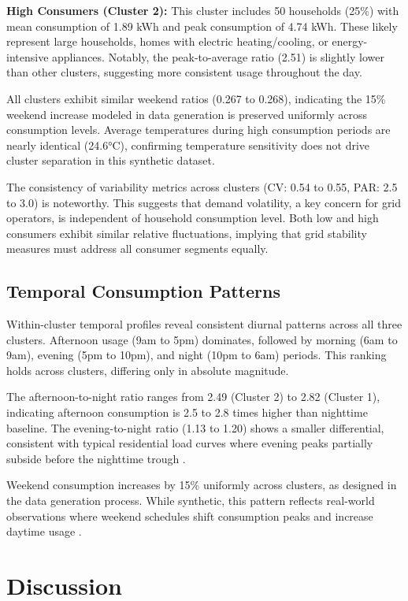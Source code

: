 \documentclass[11pt]{article}
\begin{document}
\textbf{High Consumers (Cluster 2):} This cluster includes 50 households (25\%) with mean consumption of 1.89 kWh and peak consumption of 4.74 kWh. These likely represent large households, homes with electric heating/cooling, or energy-intensive appliances. Notably, the peak-to-average ratio (2.51) is slightly lower than other clusters, suggesting more consistent usage throughout the day.

All clusters exhibit similar weekend ratios (0.267 to 0.268), indicating the 15\% weekend increase modeled in data generation is preserved uniformly across consumption levels. Average temperatures during high consumption periods are nearly identical (24.6°C), confirming temperature sensitivity does not drive cluster separation in this synthetic dataset.

The consistency of variability metrics across clusters (CV: 0.54 to 0.55, PAR: 2.5 to 3.0) is noteworthy. This suggests that demand volatility, a key concern for grid operators, is independent of household consumption level. Both low and high consumers exhibit similar relative fluctuations, implying that grid stability measures must address all consumer segments equally.

\subsection{Temporal Consumption Patterns}

Within-cluster temporal profiles reveal consistent diurnal patterns across all three clusters. Afternoon usage (9am to 5pm) dominates, followed by morning (6am to 9am), evening (5pm to 10pm), and night (10pm to 6am) periods. This ranking holds across clusters, differing only in absolute magnitude.

The afternoon-to-night ratio ranges from 2.49 (Cluster 2) to 2.82 (Cluster 1), indicating afternoon consumption is 2.5 to 2.8 times higher than nighttime baseline. The evening-to-night ratio (1.13 to 1.20) shows a smaller differential, consistent with typical residential load curves where evening peaks partially subside before the nighttime trough \cite{swan2009modeling}.

Weekend consumption increases by 15\% uniformly across clusters, as designed in the data generation process. While synthetic, this pattern reflects real-world observations where weekend schedules shift consumption peaks and increase daytime usage \cite{kwac2014household}.

\section{Discussion}
\end{document}
